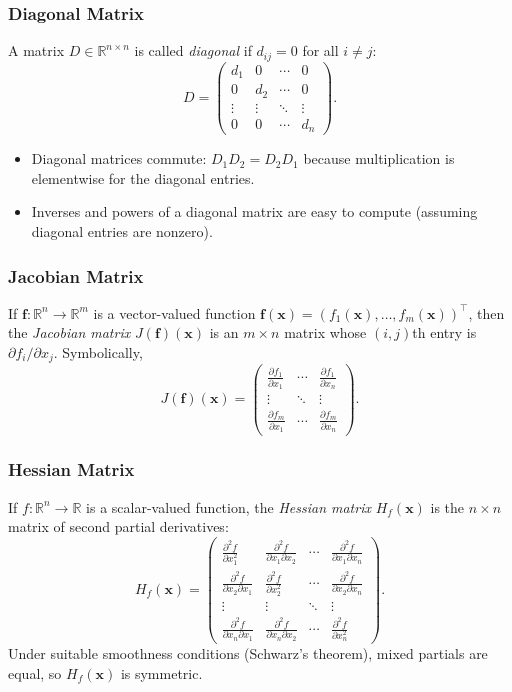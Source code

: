 \subsubsection{Diagonal Matrix}
A matrix $D \in \mathbb{R}^{n \times n}$ is called \emph{diagonal} if $d_{ij} = 0$ for all $i \neq j$:
\[
D = 
\begin{pmatrix}
d_{1} & 0 & \cdots & 0 \\
0 & d_{2} & \cdots & 0 \\
\vdots & \vdots & \ddots & \vdots \\
0 & 0 & \cdots & d_{n}
\end{pmatrix}.
\]
\begin{itemize}
    \item Diagonal matrices commute: $D_1 D_2 = D_2 D_1$ because multiplication is elementwise for the diagonal entries.
    \item Inverses and powers of a diagonal matrix are easy to compute (assuming diagonal entries are nonzero).
\end{itemize}

\subsubsection{Jacobian Matrix}
If $\mathbf{f}: \mathbb{R}^n \to \mathbb{R}^m$ is a vector-valued function 
$\mathbf{f}(\mathbf{x}) = (f_1(\mathbf{x}),\ldots,f_m(\mathbf{x}))^\top$, 
then the \emph{Jacobian matrix} $J(\mathbf{f})(\mathbf{x})$ is an $m \times n$ matrix whose 
$(i,j)$th entry is $\partial f_i/\partial x_j$. Symbolically,
\[
J(\mathbf{f})(\mathbf{x}) 
= \begin{pmatrix}
\frac{\partial f_1}{\partial x_1} & \cdots & \frac{\partial f_1}{\partial x_n} \\
\vdots & \ddots & \vdots \\
\frac{\partial f_m}{\partial x_1} & \cdots & \frac{\partial f_m}{\partial x_n}
\end{pmatrix}.
\]

\subsubsection{Hessian Matrix}
If $f: \mathbb{R}^n \to \mathbb{R}$ is a scalar-valued function, the \emph{Hessian matrix} 
$H_f(\mathbf{x})$ is the $n \times n$ matrix of second partial derivatives:
\[
H_f(\mathbf{x}) = 
\begin{pmatrix}
\frac{\partial^2 f}{\partial x_1^2} & \frac{\partial^2 f}{\partial x_1 \partial x_2} & \cdots & \frac{\partial^2 f}{\partial x_1 \partial x_n} \\
\frac{\partial^2 f}{\partial x_2 \partial x_1} & \frac{\partial^2 f}{\partial x_2^2} & \cdots & \frac{\partial^2 f}{\partial x_2 \partial x_n} \\
\vdots & \vdots & \ddots & \vdots \\
\frac{\partial^2 f}{\partial x_n \partial x_1} & \frac{\partial^2 f}{\partial x_n \partial x_2} & \cdots & \frac{\partial^2 f}{\partial x_n^2}
\end{pmatrix}.
\]
Under suitable smoothness conditions (Schwarz's theorem), mixed partials are equal, 
so $H_f(\mathbf{x})$ is symmetric.

